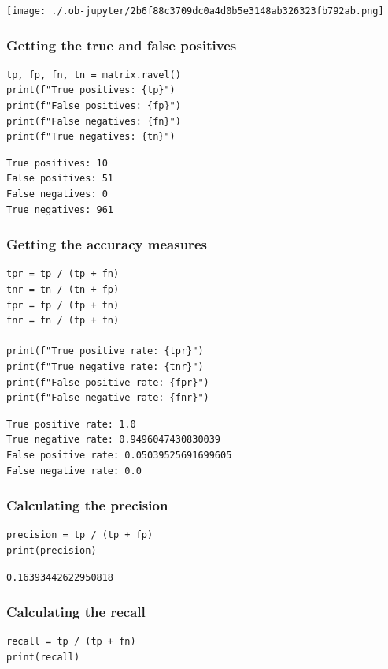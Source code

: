 \documentclass[11pt]{article}
\begin{document}
\begin{center}
\texttt{[image: ./.ob-jupyter/2b6f88c3709dc0a4d0b5e3148ab326323fb792ab.png]}
\label{org916f242}
\end{center}
\subsubsection{Getting the true and false positives}
\label{sec:org1a39126}
\begin{verbatim}
tp, fp, fn, tn = matrix.ravel()
print(f"True positives: {tp}")
print(f"False positives: {fp}")
print(f"False negatives: {fn}")
print(f"True negatives: {tn}")
\end{verbatim}

\label{org32b07f9}
\begin{verbatim}
True positives: 10
False positives: 51
False negatives: 0
True negatives: 961
\end{verbatim}
\subsubsection{Getting the accuracy measures}
\label{sec:org742cedb}
\begin{verbatim}
tpr = tp / (tp + fn)
tnr = tn / (tn + fp)
fpr = fp / (fp + tn)
fnr = fn / (tp + fn)

print(f"True positive rate: {tpr}")
print(f"True negative rate: {tnr}")
print(f"False positive rate: {fpr}")
print(f"False negative rate: {fnr}")
\end{verbatim}

\label{org752564a}
\begin{verbatim}
True positive rate: 1.0
True negative rate: 0.9496047430830039
False positive rate: 0.05039525691699605
False negative rate: 0.0
\end{verbatim}
\subsubsection{Calculating the precision}
\label{sec:org954c4ed}
\begin{verbatim}
precision = tp / (tp + fp)
print(precision)
\end{verbatim}

\label{orgd70c71a}
\begin{verbatim}
0.16393442622950818
\end{verbatim}
\subsubsection{Calculating the recall}
\label{sec:org2c86ef8}
\begin{verbatim}
recall = tp / (tp + fn)
print(recall)
\end{verbatim}
\end{document}
